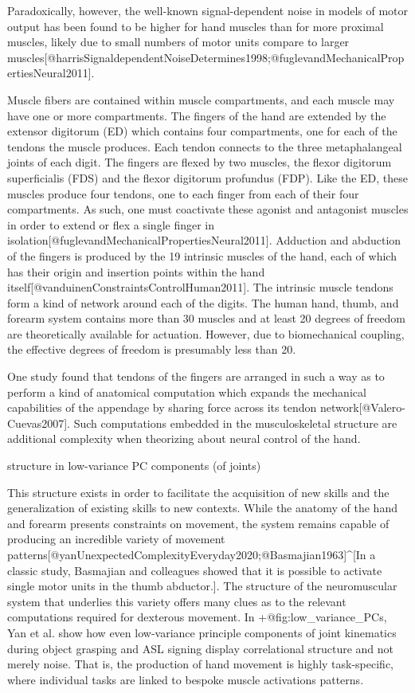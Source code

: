 \documentclass[../main.tex]{subfiles}
\begin{document}
 Paradoxically, however, the well-known signal-dependent noise in models of motor output has been found to be higher for hand muscles than for more proximal muscles, likely due to small numbers of motor units compare to larger muscles[@harrisSignaldependentNoiseDetermines1998;@fuglevandMechanicalPropertiesNeural2011]. 

Muscle fibers are contained within muscle compartments, and each muscle may have one or more compartments. The fingers of the hand are extended by the extensor digitorum (ED) which contains four compartments, one for each of the tendons the muscle produces. Each tendon connects to the three metaphalangeal joints of each digit. The fingers are flexed by two muscles, the flexor digitorum superficialis (FDS) and the flexor digitorum profundus (FDP). Like the ED, these muscles produce four tendons, one to each finger from each of their four compartments. As such, one must coactivate these agonist and antagonist muscles in order to extend or flex a single finger in isolation[@fuglevandMechanicalPropertiesNeural2011]. Adduction and abduction of the fingers is produced by the 19 intrinsic muscles of the hand, each of which has their origin and insertion points within the hand itself[@vanduinenConstraintsControlHuman2011]. The intrinsic muscle tendons form a kind of network around each of the digits. The human hand, thumb, and forearm system contains more than 30 muscles and at least 20 degrees of freedom are theoretically available for actuation. However, due to biomechanical coupling, the effective degrees of freedom is presumably less than 20.

 One study found that tendons of the fingers are arranged in such a way as to perform a kind of anatomical computation which expands the mechanical capabilities of the appendage by sharing force across its tendon network[@Valero-Cuevas2007]. Such computations embedded in the musculoskeletal structure are additional complexity when theorizing about neural control of the hand. 

 structure in low-variance PC components (of joints) 

This structure exists in order to facilitate the acquisition of new skills and the generalization of existing skills to new contexts. While the anatomy of the hand and forearm presents constraints on movement, the system remains capable of producing an incredible variety of movement patterns[@yanUnexpectedComplexityEveryday2020;@Basmajian1963]^[In a classic study, Basmajian and colleagues showed that it is possible to activate single motor units in the thumb abductor.]. The structure of the neuromuscular system that underlies this variety offers many clues as to the relevant computations required for dexterous movement. In {+@fig:low_variance_PCs}, Yan et al. show how even low-variance principle components of joint kinematics during object grasping and ASL signing display correlational structure and not merely noise. That is, the production of hand movement is highly task-specific, where individual tasks are linked to bespoke muscle activations patterns.
\end{document}
